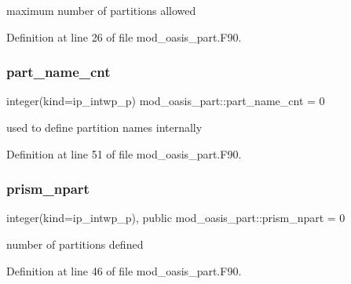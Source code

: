 maximum number of partitions allowed 



Definition at line 26 of file mod\+\_\+oasis\+\_\+part.\+F90.

\mbox{\label{namespacemod__oasis__part_a8cee930f023feb7bcad4a0cab0b490a1}} 
\subsubsection{\texorpdfstring{part\+\_\+name\+\_\+cnt}{part\_name\_cnt}}
{\footnotesize\ttfamily integer(kind=ip\+\_\+intwp\+\_\+p) mod\+\_\+oasis\+\_\+part\+::part\+\_\+name\+\_\+cnt = 0\hspace{0.3cm}{\ttfamily [private]}}



used to define partition names internally 



Definition at line 51 of file mod\+\_\+oasis\+\_\+part.\+F90.

\mbox{\label{namespacemod__oasis__part_ac8340e63b159a9786ad8fffabd1d47f8}} 
\subsubsection{\texorpdfstring{prism\+\_\+npart}{prism\_npart}}
{\footnotesize\ttfamily integer(kind=ip\+\_\+intwp\+\_\+p), public mod\+\_\+oasis\+\_\+part\+::prism\+\_\+npart = 0}



number of partitions defined 



Definition at line 46 of file mod\+\_\+oasis\+\_\+part.\+F90.

\mbox{\label{namespacemod__oasis__part_a326ce52f630ba7e71905af864a6cb2dc}} 
